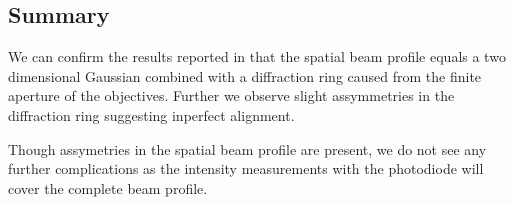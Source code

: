 \subsection{Summary}

We can confirm the results reported in \cite{Hertlein2017} that the spatial
beam profile equals a two dimensional Gaussian combined with a diffraction
ring caused from the finite aperture of the objectives. Further we observe
slight assymmetries in the diffraction ring suggesting inperfect alignment.

Though assymetries in the spatial beam profile are present, we do not see any
further complications as the intensity measurements with the photodiode will
cover the complete beam profile.
